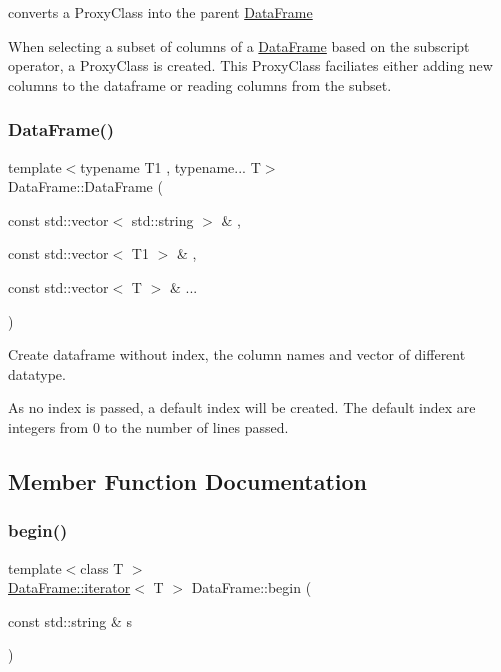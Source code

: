 converts a Proxy\+Class into the parent \hyperlink{classDataFrame}{Data\+Frame} 

When selecting a subset of columns of a \hyperlink{classDataFrame}{Data\+Frame} based on the subscript operator, a Proxy\+Class is created. This Proxy\+Class faciliates either adding new columns to the dataframe or reading columns from the subset. \mbox{\label{classDataFrame_a825048ac830a240d198c7096e86425fb}} 
\subsubsection{\texorpdfstring{Data\+Frame()}{DataFrame()}\hspace{0.1cm}{\footnotesize\ttfamily [2/2]}}
{\footnotesize\ttfamily template$<$typename T1 , typename... T$>$ \\
Data\+Frame\+::\+Data\+Frame (\begin{DoxyParamCaption}\item[{const std\+::vector$<$ std\+::string $>$ \&}]{,  }\item[{const std\+::vector$<$ T1 $>$ \&}]{,  }\item[{const std\+::vector$<$ T $>$ \&}]{... }\end{DoxyParamCaption})}



Create dataframe without index, the column names and vector of different datatype. 

As no index is passed, a default index will be created. The default index are integers from 0 to the number of lines passed. 

\subsection{Member Function Documentation}
\mbox{\label{classDataFrame_abc7986e45f6c9fc145156965bcfd8e7f}} 
\subsubsection{\texorpdfstring{begin()}{begin()}}
{\footnotesize\ttfamily template$<$class T $>$ \\
\hyperlink{classDataFrame_1_1iterator}{Data\+Frame\+::iterator}$<$ T $>$ Data\+Frame\+::begin (\begin{DoxyParamCaption}\item[{const std\+::string \&}]{s }\end{DoxyParamCaption})}



